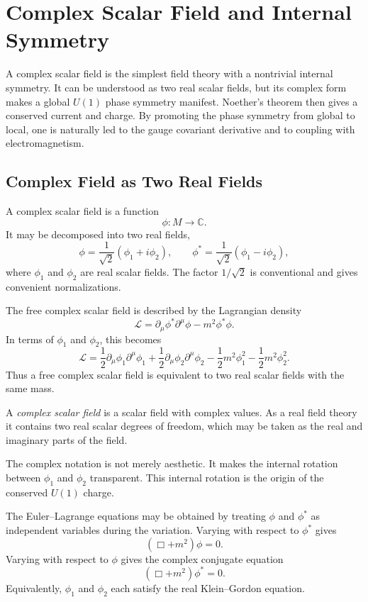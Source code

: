 \chapter{Complex Scalar Field and Internal Symmetry}

\begin{remarkbox}
A complex scalar field is the simplest field theory with a nontrivial internal
symmetry. It can be understood as two real scalar fields, but its complex form
makes a global \(U(1)\) phase symmetry manifest. Noether's theorem then gives a
conserved current and charge. By promoting the phase symmetry from global to
local, one is naturally led to the gauge covariant derivative and to coupling
with electromagnetism.
\end{remarkbox}

\section{Complex Field as Two Real Fields}

A complex scalar field is a function
\[
    \phi : M \to \mathbb{C}.
\]
It may be decomposed into two real fields,
\[
    \phi=\frac{1}{\sqrt{2}}(\phi_1+i\phi_2),
    \qquad
    \phi^*=\frac{1}{\sqrt{2}}(\phi_1-i\phi_2),
\]
where \(\phi_1\) and \(\phi_2\) are real scalar fields. The factor
\(1/\sqrt{2}\) is conventional and gives convenient normalizations.

The free complex scalar field is described by the Lagrangian density
\[
    \mathcal{L}
    =\partial_\mu\phi^*\partial^\mu\phi-m^2\phi^*\phi.
\]
In terms of \(\phi_1\) and \(\phi_2\), this becomes
\[
    \mathcal{L}
    =\frac{1}{2}\partial_\mu\phi_1\partial^\mu\phi_1
     +\frac{1}{2}\partial_\mu\phi_2\partial^\mu\phi_2
     -\frac{1}{2}m^2\phi_1^2
     -\frac{1}{2}m^2\phi_2^2.
\]
Thus a free complex scalar field is equivalent to two real scalar fields with
the same mass.

\begin{definitionbox}
A \emph{complex scalar field} is a scalar field with complex values. As a real
field theory it contains two real scalar degrees of freedom, which may be taken
as the real and imaginary parts of the field.
\end{definitionbox}

The complex notation is not merely aesthetic. It makes the internal rotation
between \(\phi_1\) and \(\phi_2\) transparent. This internal rotation is the
origin of the conserved \(U(1)\) charge.

The Euler--Lagrange equations may be obtained by treating \(\phi\) and \(\phi^*\)
as independent variables during the variation. Varying with respect to
\(\phi^*\) gives
\[
    (\Box+m^2)\phi=0.
\]
Varying with respect to \(\phi\) gives the complex conjugate equation
\[
    (\Box+m^2)\phi^*=0.
\]
Equivalently, \(\phi_1\) and \(\phi_2\) each satisfy the real Klein--Gordon
equation.

